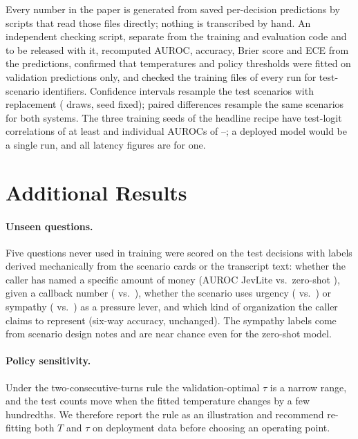 \documentclass[11pt]{article}
\begin{document}
Every number in the paper is generated from saved per-decision predictions by scripts that read those files directly; nothing is transcribed by hand. An independent checking script, separate from the training and evaluation code and to be released with it, recomputed AUROC, accuracy, Brier score and ECE from the predictions, confirmed that temperatures and policy thresholds were fitted on validation predictions only, and checked the training files of every run for test-scenario identifiers. Confidence intervals resample the \ntestscen{} test scenarios with replacement (\nboot{} draws, seed fixed); paired differences resample the same scenarios for both systems. The three training seeds of the headline recipe have test-logit correlations of at least \seedcorr{} and individual AUROCs of \seedaurocmin{}--\seedaurocmax{}; a deployed model would be a single run, and all latency figures are for one.

\section{Additional Results}
\label{app:more}


\paragraph{Unseen questions.} Five questions never used in training were scored on the test decisions with labels derived mechanically from the scenario cards or the transcript text: whether the caller has named a specific amount of money (AUROC JevLite \uqAmountjl{} vs.\ zero-shot \uqAmountzs{}), given a callback number (\uqPhonejl{} vs.\ \uqPhonezs{}), whether the scenario uses urgency (\uqUrgencyjl{} vs.\ \uqUrgencyzs{}) or sympathy (\uqSympathyjl{} vs.\ \uqSympathyzs{}) as a pressure lever, and which kind of organization the caller claims to represent (six-way accuracy, unchanged). The sympathy labels come from scenario design notes and are near chance even for the zero-shot model.

\paragraph{Policy sensitivity.} Under the two-consecutive-turns rule the validation-optimal $\tau$ is a narrow range, and the test counts move when the fitted temperature changes by a few hundredths. We therefore report the rule as an illustration and recommend re-fitting both $T$ and $\tau$ on deployment data before choosing an operating point.
\end{document}
